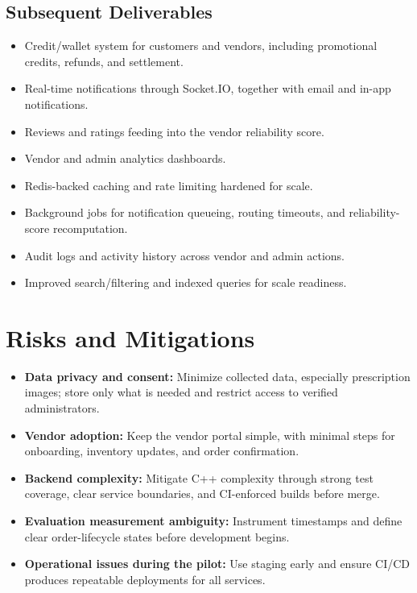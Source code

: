 \documentclass[11pt,a4paper]{article}
\begin{document}
\subsection{Subsequent Deliverables}

\begin{itemize}[leftmargin=1.5em]
    \item Credit/wallet system for customers and vendors, including promotional credits,
    refunds, and settlement.
    \item Real-time notifications through Socket.IO, together with email and in-app notifications.
    \item Reviews and ratings feeding into the vendor reliability score.
    \item Vendor and admin analytics dashboards.
    \item Redis-backed caching and rate limiting hardened for scale.
    \item Background jobs for notification queueing, routing timeouts, and reliability-score recomputation.
    \item Audit logs and activity history across vendor and admin actions.
    \item Improved search/filtering and indexed queries for scale readiness.
\end{itemize}

\section{Risks and Mitigations}

\begin{itemize}[leftmargin=1.5em]
    \item \textbf{Data privacy and consent:} Minimize collected data, especially prescription images;
    store only what is needed and restrict access to verified administrators.
    \item \textbf{Vendor adoption:} Keep the vendor portal simple, with minimal steps for onboarding,
    inventory updates, and order confirmation.
    \item \textbf{Backend complexity:} Mitigate C++ complexity through strong test coverage,
    clear service boundaries, and CI-enforced builds before merge.
    \item \textbf{Evaluation measurement ambiguity:} Instrument timestamps and define clear
    order-lifecycle states before development begins.
    \item \textbf{Operational issues during the pilot:} Use staging early and ensure CI/CD produces
    repeatable deployments for all services.
\end{itemize}
\end{document}
